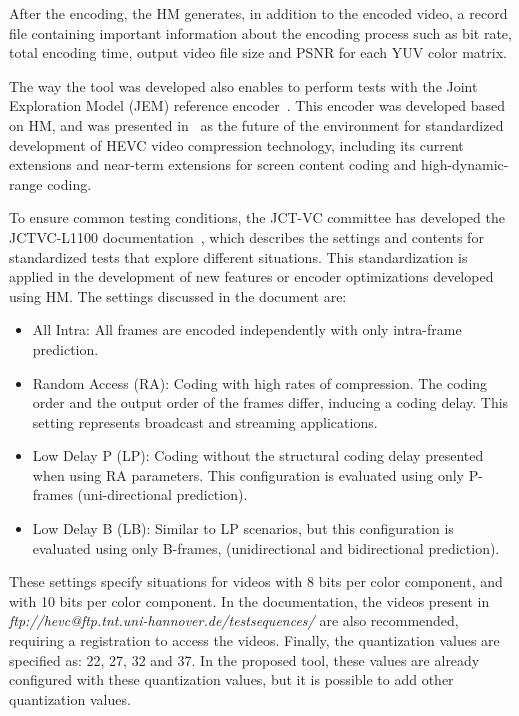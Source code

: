 \documentclass[journal]{IEEEtran}
\begin{document}
After the encoding, the HM generates, in addition to the encoded video, a record file containing important information about the encoding process such as bit rate, total encoding time, output video file size and PSNR for each YUV color matrix.


The way the tool was developed also enables to perform tests with the Joint Exploration Model (JEM) reference encoder~\cite{Bossen:17}. This encoder was developed based on HM, and was presented in~\cite{JVET:2015} as the future of the environment for standardized development of HEVC video compression technology, including its current extensions and near-term extensions for screen content coding and high-dynamic-range coding.



To ensure common testing conditions, the JCT-VC committee has developed the JCTVC-L1100 documentation~\cite{Bossen:13}, which describes the settings and contents for standardized tests that explore different situations. This standardization is applied in the development of new features or encoder optimizations developed using HM. The settings discussed in the document are:

\begin{itemize}
\label{config}

  \item All Intra: All frames are encoded independently with only intra-frame prediction.
  \item Random Access (RA): Coding with high rates of compression. The coding order and the output order of the frames differ, inducing a coding delay. This setting represents broadcast and streaming applications.
  \item Low Delay P (LP): Coding without the structural coding delay presented when using RA parameters. This configuration is evaluated using only P-frames (uni-directional prediction).
  \item Low Delay B (LB): Similar to LP scenarios, but this configuration is evaluated using only B-frames, (unidirectional and bidirectional prediction).

\end{itemize}

These settings specify situations for videos with 8 bits per color component, and with 10 bits per color component. In the documentation, the videos present in \emph{ftp://hevc@ftp.tnt.uni-hannover.de/testsequences/} are also recommended, requiring a registration to access the videos. Finally, the quantization values are specified as: 22, 27, 32 and 37. In the proposed tool, these values are already configured with these quantization values, but it is possible to add other quantization values.
\end{document}
